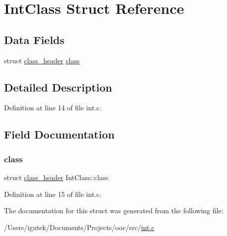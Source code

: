 \hypertarget{structIntClass}{}\section{Int\+Class Struct Reference}
\label{structIntClass}
\subsection*{Data Fields}
\begin{DoxyCompactItemize}
\item 
struct \mbox{\hyperlink{structclass__header}{class\+\_\+header}} \mbox{\hyperlink{structIntClass_a434c7c785b8a61096c69491220ab8543}{class}}
\end{DoxyCompactItemize}


\subsection{Detailed Description}


Definition at line 14 of file int.\+c.



\subsection{Field Documentation}
\mbox{\label{structIntClass_a434c7c785b8a61096c69491220ab8543}} 
\subsubsection{\texorpdfstring{class}{class}}
{\footnotesize\ttfamily struct \mbox{\hyperlink{structclass__header}{class\+\_\+header}} Int\+Class\+::class}



Definition at line 15 of file int.\+c.



The documentation for this struct was generated from the following file\+:\begin{DoxyCompactItemize}
\item 
/\+Users/igutek/\+Documents/\+Projects/ooc/src/\mbox{\hyperlink{int_8c}{int.\+c}}\end{DoxyCompactItemize}
